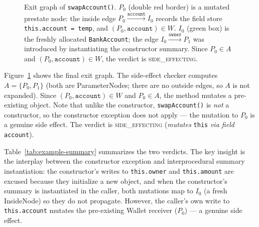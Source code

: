 \begin{figure}[h]
\centering
{}
\caption{Exit graph of \texttt{swapAccount()}.
  $P_0$ (double red border) is a mutated prestate node: the inside edge $P_0 \xrightarrow{\texttt{account}} I_0$ records the field store \texttt{this.account = temp}, and $(P_0, \texttt{account}) \in W$.
  $I_0$ (green box) is the freshly allocated \texttt{BankAccount}; the edge $I_0 \xrightarrow{\texttt{owner}} P_1$ was introduced by instantiating the constructor summary.
  Since $P_0 \in A$ and $(P_0, \texttt{account}) \in W$, the verdict is \textsc{side\_effecting}.}
\label{fig:swap-exit}
\end{figure}

\noindent
Figure~\ref{fig:swap-exit} shows the final exit graph.
The side-effect checker computes $A = \{P_0, P_1\}$ (both are ParameterNodes; there are no outside edges, so $A$ is not expanded).
Since $(P_0, \texttt{account}) \in W$ and $P_0 \in A$, the method mutates a pre-existing object.
Note that unlike the constructor, \texttt{swapAccount()} is \emph{not} a constructor, so the constructor exception does not apply --- the mutation to $P_0$ is a genuine side effect.
The verdict is \textsc{side\_effecting} (\textit{mutates} \texttt{this} \textit{via field} \texttt{account}).

\medskip
\noindent
Table~\ref{tab:example-summary} summarizes the two verdicts. The key insight is the interplay between the constructor exception and interprocedural summary instantiation: the constructor's writes to \texttt{this.owner} and \texttt{this.amount} are excused because they initialize a new object, and when the constructor's summary is instantiated in the caller, both mutations map to $I_0$ (a fresh InsideNode) so they do not propagate. However, the caller's own write to \texttt{this.account} mutates the pre-existing Wallet receiver ($P_0$) --- a genuine side effect.

